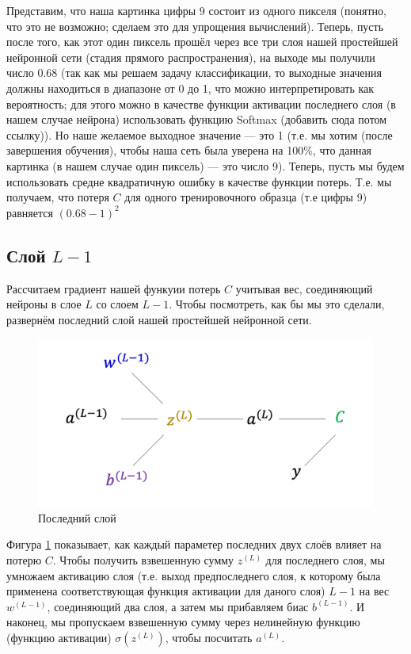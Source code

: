 \documentclass[a4paper, 10pt, openany]{book} %
\begin{document}
	Представим, что наша картинка цифры $9$ состоит из одного пикселя (понятно, что это не возможно; сделаем это для упрощения вычислений). Теперь, пусть после того, как этот один пиксель прошёл через все три слоя нашей простейшей нейронной сети (стадия прямого распространения), на выходе мы получили число 0.68 (так как мы решаем задачу классификации, то выходные значения должны находиться в диапазоне от 0 до 1, что можно интерпретировать как вероятность; для этого можно в качестве функции активации последнего слоя (в нашем случае нейрона) использовать функцию Softmax (добавить сюда потом ссылку)). Но наше желаемое выходное значение --- это 1 (т.е. мы хотим (после завершения обучения), чтобы наша сеть была уверена на 100\%, что данная картинка (в нашем случае один пиксель) --- это число 9). Теперь, пусть мы будем использовать средне квадратичную ошибку в качестве функции потерь. Т.е. мы получаем, что потеря $C$ для одного тренировочного образца (т.е цифры 9) равняется $(0.68-1)^2$
	
	\subsection{Слой $L-1$}
	
	Рассчитаем градиент нашей функуии потерь $C$ учитывая вес, соединяющий нейроны в слое $L$ со слоем $L-1$. Чтобы посмотреть, как бы мы это сделали, развернём последний слой нашей простейшей нейронной сети.
	
	\begin{figure}[h!]
		\centering
		\includegraphics[width=\linewidth]{pictures/backpropagation/last_layer.png}
		\caption{Последний слой}
		\label{last_layer}
	\end{figure}
	
	Фигура \ref{last_layer} показывает, как каждый параметер последних двух слоёв влияет на потерю $C$. Чтобы получить взвешенную сумму $z^{(L)}$ для последнего слоя, мы умножаем активацию слоя (т.е. выход предпоследнего слоя, к которому была применена соответствующая функция активации для даного слоя) $L-1$ на вес $w^{(L-1)}$, соединяющий два слоя, а затем мы прибавляем биас $b^{(L-1)}$. И наконец, мы пропускаем взвешенную сумму через нелинейную функцию (функцию активации) $\sigma(z^{(L)})$, чтобы посчитать $a^{(L)}$.
	
\end{document}
